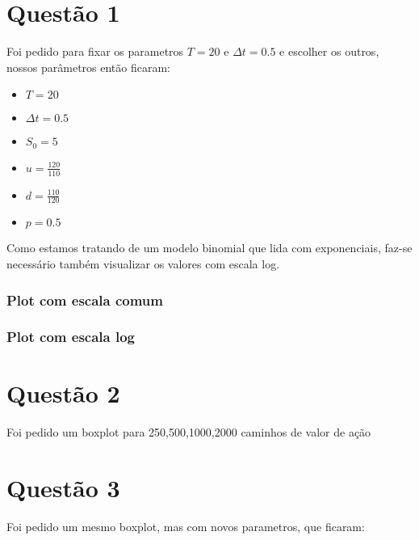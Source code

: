 \documentclass[
	11pt,				%
	openright,			%
	oneside,			%
	a4paper,			%
	english,			%
	french,				%
	spanish,			%
	brazil,				%
	]{abntex2}
\begin{document}
\chapter{Questão 1}
Foi pedido para fixar os parametros \(T = 20\) e \(\Delta t = 0.5\) e escolher os outros, nossos parâmetros então ficaram:
\begin{itemize}
  \item \(T = 20\)
  \item \(\Delta t = 0.5\)
	\item \(S_0 = 5\)
  \item \(u = \frac{120}{110}\)
  \item \(d = \frac{110}{120}\)
  \item \(p = 0.5\)
\end{itemize}
Como estamos tratando de um modelo binomial que lida com exponenciais, faz-se necessário também visualizar os valores com escala log.
\subsection{Plot com escala comum}
  \begin{figure}[h]
  \end{figure}
	\subsection{Plot com escala log}
	\begin{figure}[h]
	\end{figure}

\chapter{Questão 2}
Foi pedido um boxplot para 250,500,1000,2000 caminhos de valor de ação
\begin{figure}[h]
\end{figure}

\chapter{Questão 3}
Foi pedido um mesmo boxplot, mas com novos parametros, que ficaram:
\begin{figure}[h]
\end{figure}
\end{document}
